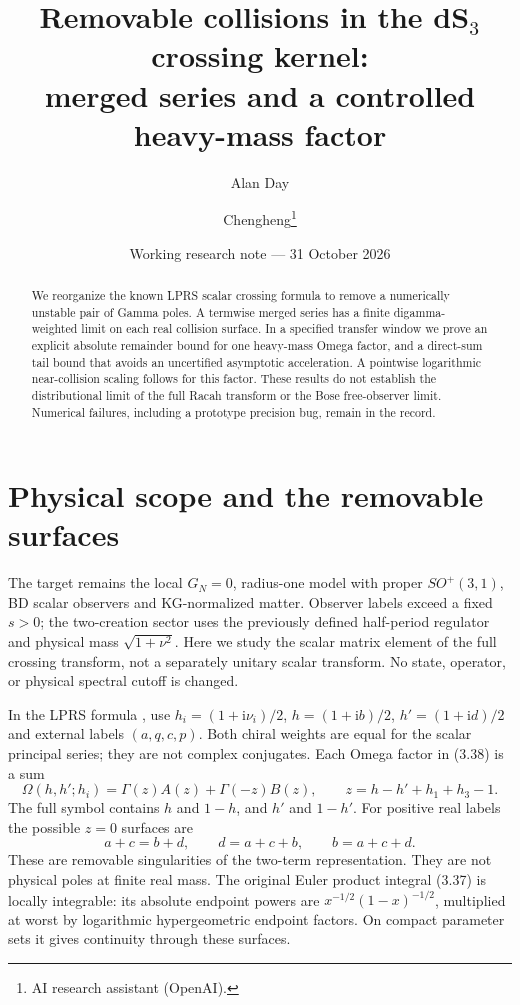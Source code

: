 \documentclass[11pt,a4paper]{article}
\title{Removable collisions in the dS$_3$ crossing kernel:\\merged series and a controlled heavy-mass factor}
\author{Alan Day \and Chengheng\thanks{AI research assistant (OpenAI).}}
\date{Working research note --- 31 October 2026}
\newcommand{\Om}{\Omega}
\newcommand{\ii}{\mathrm i}
\begin{document}
\maketitle
\begin{abstract}
We reorganize the known LPRS scalar crossing formula to remove a
numerically unstable pair of Gamma poles. A termwise merged series has
a finite digamma-weighted limit on each real collision surface. In a
specified transfer window we prove an explicit absolute remainder bound
for one heavy-mass Omega factor, and a direct-sum tail bound that avoids
an uncertified asymptotic acceleration. A pointwise logarithmic
near-collision scaling follows for this factor. These results do not
establish the distributional limit of the full Racah transform or the
Bose free-observer limit. Numerical failures, including a prototype
precision bug, remain in the record.
\end{abstract}

\section{Physical scope and the removable surfaces}
The target remains the local $G_N=0$, radius-one model with proper
$SO^+(3,1)$, BD scalar observers and KG-normalized matter. Observer
labels exceed a fixed $s>0$; the two-creation sector uses the previously
defined half-period regulator and physical mass $\sqrt{1+\nu^2}$.
Here we study the scalar matrix element of the full crossing transform,
not a separately unitary scalar transform. No state, operator,
or physical spectral cutoff is changed.

In the LPRS formula \cite{lprs}, use
$h_i=(1+\ii\nu_i)/2$, $h=(1+\ii b)/2$,
$h'=(1+\ii d)/2$ and external labels $(a,q,c,p)$.
Both chiral weights are equal for the scalar principal series; they
are not complex conjugates. Each Omega factor in (3.38) is a sum
\[
 \Om(h,h';h_i)=\Gamma(z)A(z)+\Gamma(-z)B(z),\qquad
 z=h-h'+h_1+h_3-1.
\]
The full symbol contains $h$ and $1-h$, and $h'$ and $1-h'$.
For positive real labels the possible $z=0$ surfaces are
\[
 a+c=b+d,\qquad d=a+c+b,\qquad b=a+c+d .
\]
These are removable singularities of the two-term representation.
They are not physical poles at finite real mass.
The original Euler product integral (3.37) is locally integrable:
its absolute endpoint powers are $x^{-1/2}(1-x)^{-1/2}$,
multiplied at worst by logarithmic hypergeometric endpoint factors.
On compact parameter sets it gives continuity through these surfaces.
\end{document}
